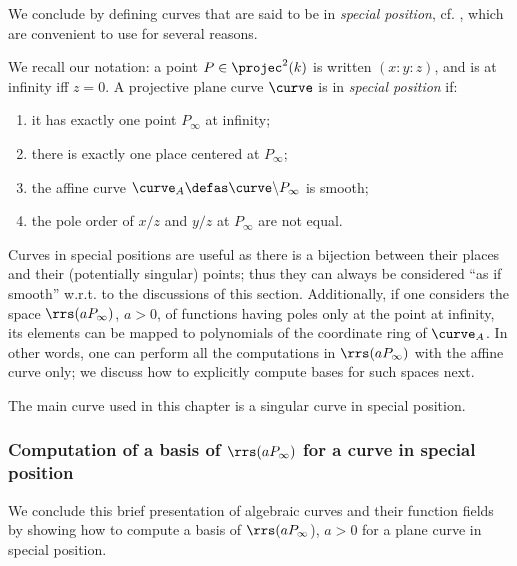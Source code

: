 We conclude by defining curves that are said to be in \emph{special position}, cf. \eg \cite{DBLP:journals/tit/SaintsH95}, which are convenient to use for several reasons.

\begin{defi}
We recall our notation: a point $P \in \projec^2(k)$ is written $(x : y : z)$, and is
at infinity iff $z = 0$.
A projective plane curve $\curve$ is in \emph{special position}
if:
\begin{enumerate}
\item it has exactly one point $P_\infty$ at infinity;
\item there is exactly one place centered at $P_\infty$;
\item the affine curve $\curve_A \defas \curve\backslash P_\infty$ is smooth;
\item the pole order of $x/z$ and $y/z$ at $P_\infty$ are not equal.
\end{enumerate}
\end{defi}

Curves in special positions are useful as there is a bijection between their places and their (potentially singular) points; thus they can always be considered
``as if smooth'' w.r.t. to the discussions of this section. Additionally, if one considers the space $\rrs(aP_\infty)$, $a > 0$, of functions having poles only at the point at infinity,
its elements can be mapped to polynomials of the coordinate ring of $\curve_A$. In other words, one can perform all the computations in $\rrs(aP_\infty)$ with the affine curve
only; we discuss how to explicitly compute bases for such spaces next.

The main curve used in this chapter is a singular curve in special position.

\subsubsection{Computation of a basis of $\rrs(aP_\infty)$ for a curve in special position}

We conclude this brief presentation of algebraic curves and their function fields by showing how to compute a basis of $\rrs(aP_\infty$), $a > 0$
for a plane curve in special position.

